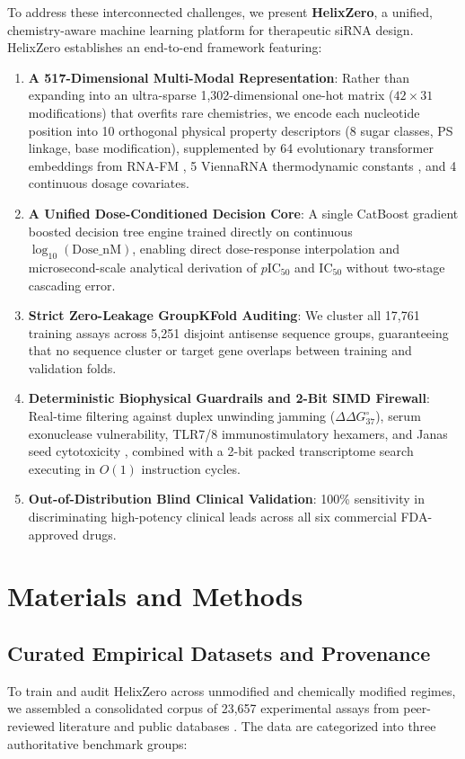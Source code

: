 \documentclass[twocolumn]{article}
\begin{document}
To address these interconnected challenges, we present \textbf{HelixZero}, a unified, chemistry-aware machine learning platform for therapeutic siRNA design. HelixZero establishes an end-to-end framework featuring:
\begin{enumerate}
    \item \textbf{A 517-Dimensional Multi-Modal Representation}: Rather than expanding into an ultra-sparse 1,302-dimensional one-hot matrix ($42 \times 31$ modifications) that overfits rare chemistries, we encode each nucleotide position into 10 orthogonal physical property descriptors (8 sugar classes, PS linkage, base modification), supplemented by 64 evolutionary transformer embeddings from RNA-FM \cite{chen2022rnafm}, 5 ViennaRNA thermodynamic constants \cite{lorenz2011viennarna}, and 4 continuous dosage covariates.
    \item \textbf{A Unified Dose-Conditioned Decision Core}: A single CatBoost gradient boosted decision tree engine trained directly on continuous $\log_{10}(\text{Dose\_nM})$, enabling direct dose-response interpolation and microsecond-scale analytical derivation of $p\text{IC}_{50}$ and $\text{IC}_{50}$ without two-stage cascading error.
    \item \textbf{Strict Zero-Leakage GroupKFold Auditing}: We cluster all 17,761 training assays across 5,251 disjoint antisense sequence groups, guaranteeing that no sequence cluster or target gene overlaps between training and validation folds.
    \item \textbf{Deterministic Biophysical Guardrails and 2-Bit SIMD Firewall}: Real-time filtering against duplex unwinding jamming ($\Delta\Delta G^\circ_{37}$), serum exonuclease vulnerability, TLR7/8 immunostimulatory hexamers, and Janas seed cytotoxicity \cite{janas2018selection}, combined with a 2-bit packed transcriptome search executing in $O(1)$ instruction cycles.
    \item \textbf{Out-of-Distribution Blind Clinical Validation}: 100\% sensitivity in discriminating high-potency clinical leads across all six commercial FDA-approved drugs.
\end{enumerate}

\section{Materials and Methods}

\subsection{Curated Empirical Datasets and Provenance}
To train and audit HelixZero across unmodified and chemically modified regimes, we assembled a consolidated corpus of 23,657 experimental assays from peer-reviewed literature and public databases \cite{davis2025nar,huesken2005design,takayuki2013sirna}. The data are categorized into three authoritative benchmark groups:
\end{document}
